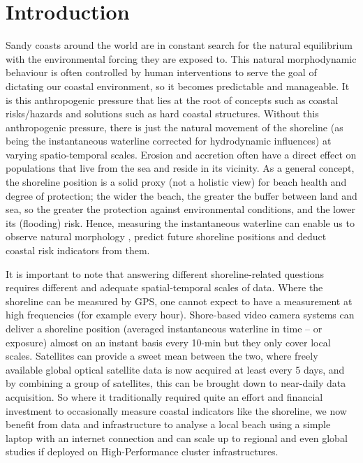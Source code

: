 \documentclass[remotesensing,article,submit,pdftex,moreauthors]{Definitions/mdpi}
\begin{document}
\section{Introduction}
Sandy coasts around the world are in constant search for the natural equilibrium with the environmental forcing they are exposed to. This natural morphodynamic behaviour is often controlled by human interventions to serve the goal of dictating our coastal environment, so it becomes predictable and manageable. It is this anthropogenic pressure that lies at the root of concepts such as coastal risks/hazards and solutions such as hard coastal structures. Without this anthropogenic pressure, there is just the natural movement of the shoreline (as being the instantaneous waterline corrected for hydrodynamic influences) at varying spatio-temporal scales. Erosion and accretion often have a direct effect on populations that live from the sea and reside in its vicinity. As a general concept, the shoreline position is a solid proxy (not a holistic view) for beach health and degree of protection; the wider the beach, the greater the buffer between land and sea, so the greater the protection against environmental conditions, and the lower its (flooding) risk. Hence, measuring the instantaneous waterline can enable us to observe natural morphology \citep{Vitousek:17b}, predict future shoreline positions \citep{vitousek:23} and deduct coastal risk indicators from them.

It is important to note that answering different shoreline-related questions requires different and adequate spatial-temporal scales of data\cite{bergsma2022wave}. Where the shoreline can be measured by GPS, one cannot expect to have a measurement at high frequencies (for example every hour). Shore-based video camera systems can deliver a shoreline position (averaged instantaneous waterline in time -- or exposure) almost on an instant basis every 10-min but they only cover local scales. Satellites can provide a sweet mean between the two, where freely available global optical satellite data is now acquired at least every 5 days, and by combining a group of satellites, this can be brought down to near-daily data acquisition. So where it traditionally required quite an effort and financial investment to occasionally measure coastal indicators like the shoreline, we now benefit from data and infrastructure to analyse a local beach using a simple laptop with an internet connection and can scale up to regional and even global studies if deployed on High-Performance cluster infrastructures. 
\end{document}
